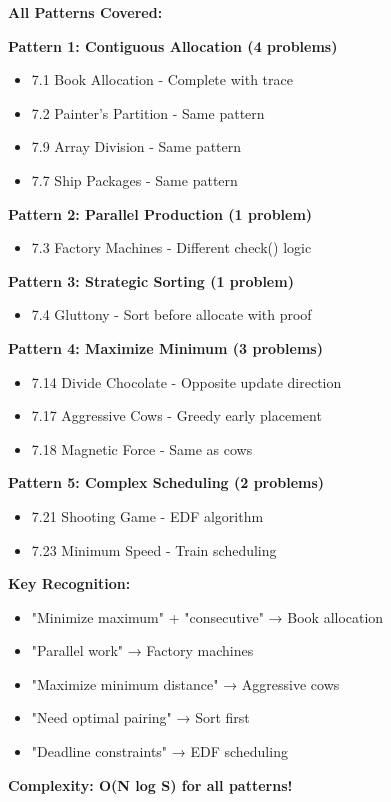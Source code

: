\documentclass[11pt,a4paper,oneside]{book}
\begin{document}
\begin{tcolorbox}[
    enhanced,breakable,
    colback=primaryblue!10,
    colframe=primaryblue,
    boxrule=2pt,
    arc=4mm,
    title=\textbf{Allocation Problems: Complete Mastery}
]
\textbf{All Patterns Covered:}

\textbf{Pattern 1: Contiguous Allocation (4 problems)}
\begin{itemize}
\item 7.1 Book Allocation - Complete with trace
\item 7.2 Painter's Partition - Same pattern
\item 7.9 Array Division - Same pattern
\item 7.7 Ship Packages - Same pattern
\end{itemize}

\textbf{Pattern 2: Parallel Production (1 problem)}
\begin{itemize}
\item 7.3 Factory Machines - Different check() logic
\end{itemize}

\textbf{Pattern 3: Strategic Sorting (1 problem)}
\begin{itemize}
\item 7.4 Gluttony - Sort before allocate with proof
\end{itemize}

\textbf{Pattern 4: Maximize Minimum (3 problems)}
\begin{itemize}
\item 7.14 Divide Chocolate - Opposite update direction
\item 7.17 Aggressive Cows - Greedy early placement
\item 7.18 Magnetic Force - Same as cows
\end{itemize}

\textbf{Pattern 5: Complex Scheduling (2 problems)}
\begin{itemize}
\item 7.21 Shooting Game - EDF algorithm
\item 7.23 Minimum Speed - Train scheduling
\end{itemize}

\textbf{Key Recognition:}
\begin{itemize}
\item "Minimize maximum" + "consecutive" → Book allocation
\item "Parallel work" → Factory machines
\item "Maximize minimum distance" → Aggressive cows
\item "Need optimal pairing" → Sort first
\item "Deadline constraints" → EDF scheduling
\end{itemize}

\textbf{Complexity: O(N log S) for all patterns!}
\end{tcolorbox}
\end{document}
